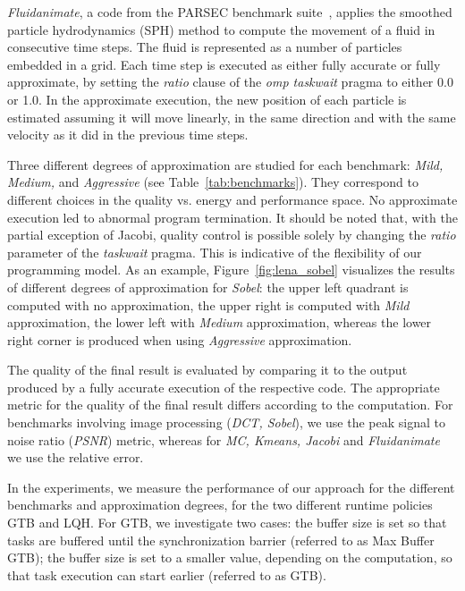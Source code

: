 \textit{Fluidanimate}, a code from the PARSEC benchmark suite~\cite{Bienia:2008:PBS:1454115.1454128}, applies the smoothed particle hydrodynamics (SPH) method to compute the movement of a fluid in consecutive time steps. The fluid is represented as a number of particles embedded in a grid. Each time step is executed as either fully accurate or fully approximate, by setting the {\it ratio} clause of the {\it omp taskwait} pragma to either 0.0 or 1.0. In the approximate execution, the new position of each particle is estimated assuming it will move linearly, in the same direction and with the same velocity as it did in the previous time steps. 



Three different degrees of approximation are studied for each benchmark: \textit{Mild, Medium, } and \textit{Aggressive} (see Table~\ref{tab:benchmarks}). They correspond to different choices in the quality vs. energy and performance space. No approximate execution led to abnormal program termination. It should be noted that, with the partial exception of Jacobi, quality control is possible solely by changing the {\it ratio} parameter of the {\it taskwait} pragma. This is indicative of the flexibility of our programming model. As an example, Figure~\ref{fig:lena_sobel} visualizes the results of different degrees of approximation for \textit{Sobel}: the upper left quadrant is computed with no approximation, the upper right is computed with \textit{Mild} approximation, the lower left with \textit{Medium} approximation, whereas the lower right corner is produced when using \textit{Aggressive} approximation.

The quality of the final result is evaluated by comparing it to the output produced by a fully accurate execution of the respective code. The appropriate metric for the quality of the final result differs according to the computation. For benchmarks involving image processing (\textit{DCT, Sobel}), we use the peak signal to noise ratio (\textit{PSNR}) metric, whereas for \textit{MC, Kmeans, Jacobi} and \textit{Fluidanimate} we use the relative error.

In the experiments, we measure the performance of our approach for the different benchmarks and approximation degrees, for the two different runtime policies GTB and LQH. For GTB, we investigate two cases: the buffer size is set so that tasks are buffered until the synchronization barrier (referred to as Max Buffer GTB); the buffer size is set to a smaller value, depending on the computation, so that task execution can start earlier (referred to as GTB). 

